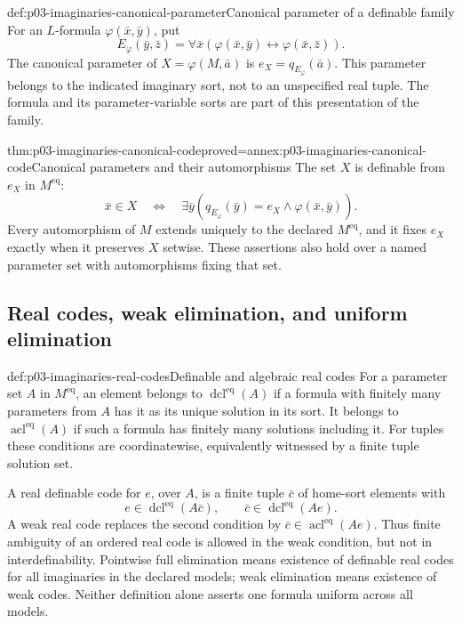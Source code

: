 \begin{hbdefinition}{def:p03-imaginaries-canonical-parameter}{Canonical parameter of a definable family}
For an \(L\)-formula \(\varphi(\bar x,\bar y)\), put
\[
 E_\varphi(\bar y,\bar z)
       =\forall\bar x(\varphi(\bar x,\bar y)
                        \leftrightarrow\varphi(\bar x,\bar z)).
\]
The canonical parameter of \(X=\varphi(M,\bar a)\) is
\(e_X=q_{E_\varphi}(\bar a)\). This parameter belongs to the indicated
imaginary sort, not to an unspecified real tuple. The formula and its
parameter-variable sorts are part of this presentation of the family.
\end{hbdefinition}

\begin{hbtheorem}{thm:p03-imaginaries-canonical-code}{proved=annex:p03-imaginaries-canonical-code}{Canonical parameters and their automorphisms}
The set \(X\) is definable from \(e_X\) in \(M^{\mathrm{eq}}\):
\[
 \bar x\in X\quad\Longleftrightarrow\quad
 \exists\bar y(q_{E_\varphi}(\bar y)=e_X\land\varphi(\bar x,\bar y)).
\]
Every automorphism of \(M\) extends uniquely to the declared
\(M^{\mathrm{eq}}\), and it fixes \(e_X\) exactly when it preserves
\(X\) setwise. These assertions also hold over a named parameter set with
automorphisms fixing that set.
\end{hbtheorem}

\subsection{Real codes, weak elimination, and uniform elimination}

\begin{hbdefinition}{def:p03-imaginaries-real-codes}{Definable and algebraic real codes}
For a parameter set \(A\) in \(M^{\mathrm{eq}}\), an element belongs
to \(\operatorname{dcl}^{\mathrm{eq}}(A)\) if a formula with finitely
many parameters from \(A\) has it as its unique solution in its sort.
It belongs to \(\operatorname{acl}^{\mathrm{eq}}(A)\) if such a
formula has finitely many solutions including it. For tuples these conditions
are coordinatewise, equivalently witnessed by a finite tuple solution set.

A real definable code for \(e\), over \(A\), is a finite tuple
\(\bar c\) of home-sort elements with
\[
 e\in\operatorname{dcl}^{\mathrm{eq}}(A\bar c),\qquad
 \bar c\in\operatorname{dcl}^{\mathrm{eq}}(Ae).
\]
A weak real code replaces the second condition by
\(\bar c\in\operatorname{acl}^{\mathrm{eq}}(Ae)\).
Thus finite ambiguity of an ordered real code is allowed in the weak
condition, but not in interdefinability. Pointwise full elimination means existence
of definable real codes for all imaginaries in the declared models; weak
elimination means existence of weak codes. Neither definition alone asserts
one formula uniform across all models.
\end{hbdefinition}

